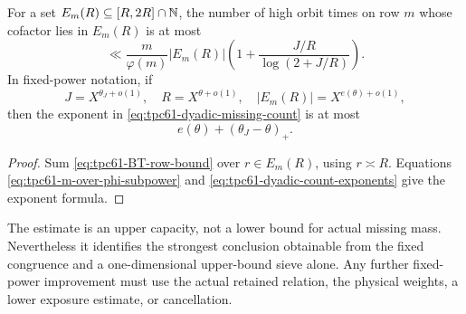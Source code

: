 \begin{corollary}
\label{cor:tpc61-dyadic-missing-census}
For a set \(E_m(R)\subseteq[R,2R]\cap\mathbb N\), the number of high orbit
times on row \(m\) whose cofactor lies in \(E_m(R)\) is at most
\begin{equation}
 \ll
 \frac m{\varphi(m)}|E_m(R)|
 \left(
  1+\frac{J/R}{\log(2+J/R)}
 \right).
 \label{eq:tpc61-dyadic-missing-count}
\end{equation}
In fixed-power notation, if
\begin{equation}
 J=X^{\theta_J+o(1)},\quad
 R=X^{\theta+o(1)},\quad
 |E_m(R)|=X^{e(\theta)+o(1)},
 \label{eq:tpc61-dyadic-count-exponents}
\end{equation}
then the exponent in \eqref{eq:tpc61-dyadic-missing-count} is at most
\begin{equation}
 e(\theta)+(\theta_J-\theta)_+.
 \label{eq:tpc61-dyadic-capacity-exponent}
\end{equation}
\end{corollary}

\begin{proof}
Sum \eqref{eq:tpc61-BT-row-bound} over \(r\in E_m(R)\), using
\(r\asymp R\).  Equations
\eqref{eq:tpc61-m-over-phi-subpower} and
\eqref{eq:tpc61-dyadic-count-exponents} give the exponent formula.
\end{proof}

The estimate is an upper capacity, not a lower bound for actual missing
mass.  Nevertheless it identifies the strongest conclusion obtainable
from the fixed congruence and a one-dimensional upper-bound sieve alone.
Any further fixed-power improvement must use the actual retained relation,
the physical weights, a lower exposure estimate, or cancellation.
